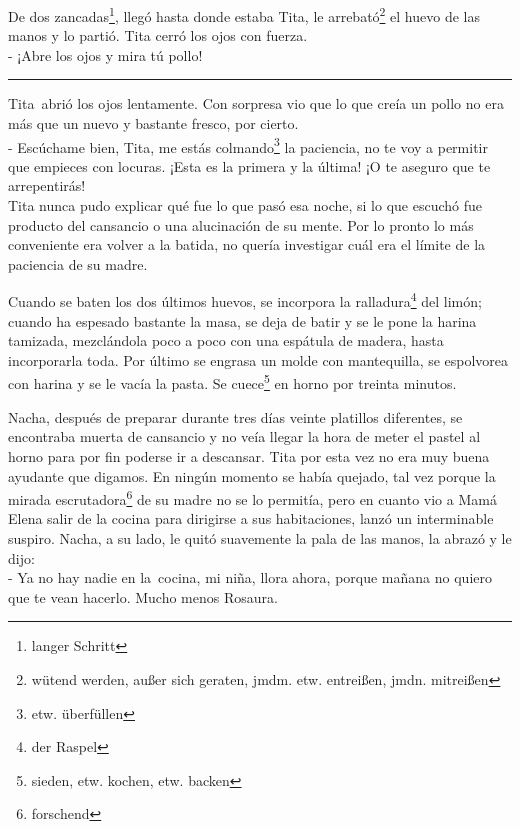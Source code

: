 De dos zancadas\footnote{langer Schritt}, llegó hasta donde
estaba Tita, le arrebató\footnote{wütend werden, außer sich geraten, jmdm. etw. entreißen, jmdn. mitreißen}
el huevo de las manos y lo partió.
Tita cerró los ojos con fuerza.
\\- ¡Abre los ojos y mira tú pollo! \\
\rule{1em}{0pt}Tita~abrió los ojos lentamente. Con sorpresa vio que lo que creía
un pollo no era más que un nuevo y bastante fresco, por cierto.
\\- Escúchame bien, Tita, me estás colmando\footnote{etw. überfüllen} %
la paciencia, no te voy a permitir que empieces con locuras. ¡Esta es la %
primera y la última! ¡O te aseguro que te arrepentirás!\\

Tita nunca pudo explicar qué fue lo que pasó esa noche, si lo que
escuchó fue producto del cansancio o una alucinación de su mente. Por lo
pronto lo más conveniente era volver a la batida, no quería investigar
cuál era el límite de la paciencia de su madre.

Cuando se baten los dos últimos huevos, se incorpora la ralladura\footnote{der Raspel} del
limón; cuando ha espesado bastante la masa, se deja de batir y se le
pone la harina tamizada, mezclándola poco a poco con una espátula de
madera, hasta incorporarla toda. Por último se engrasa un molde con
mantequilla, se espolvorea con harina y se le vacía la pasta. Se cuece\footnote{sieden, etw. kochen, etw. backen} en horno por treinta
minutos.

Nacha, después de preparar durante tres días veinte platillos diferentes, se
encontraba muerta de cansancio y no veía llegar la hora de meter el
pastel al horno para por fin poderse ir a descansar. Tita por esta vez
no era muy buena ayudante que digamos. En ningún momento se había
quejado, tal vez porque la mirada escrutadora\footnote{forschend}
de su madre no se lo permitía, pero en cuanto vio a Mamá Elena salir de la
cocina para dirigirse a sus habitaciones, lanzó un interminable suspiro.
Nacha, a su lado, le quitó suavemente la pala de las manos, la abrazó y le dijo:
\\- Ya no hay nadie en la~cocina, mi niña, llora ahora, porque mañana %
no quiero que te vean hacerlo. Mucho menos Rosaura.\\

